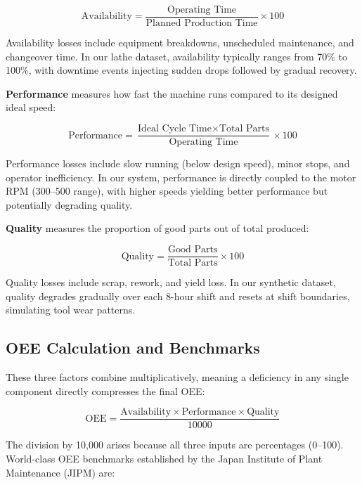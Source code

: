 \documentclass[a4paper,11pt]{article}
\begin{document}
\begin{equation}
\text{Availability} = \frac{\text{Operating Time}}{\text{Planned Production Time}} \times 100
\end{equation}

Availability losses include equipment breakdowns, unscheduled maintenance, and changeover time. In our lathe dataset, availability typically ranges from 70\% to 100\%, with downtime events injecting sudden drops followed by gradual recovery.

\textbf{Performance} measures how fast the machine runs compared to its designed ideal speed:

\begin{equation}
\text{Performance} = \frac{\text{Ideal Cycle Time} \times \text{Total Parts}}{\text{Operating Time}} \times 100
\end{equation}

Performance losses include slow running (below design speed), minor stops, and operator inefficiency. In our system, performance is directly coupled to the motor RPM (300--500 range), with higher speeds yielding better performance but potentially degrading quality.

\textbf{Quality} measures the proportion of good parts out of total produced:

\begin{equation}
\text{Quality} = \frac{\text{Good Parts}}{\text{Total Parts}} \times 100
\end{equation}

Quality losses include scrap, rework, and yield loss. In our synthetic dataset, quality degrades gradually over each 8-hour shift and resets at shift boundaries, simulating tool wear patterns.

\subsection{OEE Calculation and Benchmarks}

These three factors combine multiplicatively, meaning a deficiency in any single component directly compresses the final OEE:

\begin{equation}
\text{OEE} = \frac{\text{Availability} \times \text{Performance} \times \text{Quality}}{10000}
\end{equation}

The division by 10,000 arises because all three inputs are percentages (0--100). World-class OEE benchmarks established by the Japan Institute of Plant Maintenance (JIPM) are:
\end{document}
